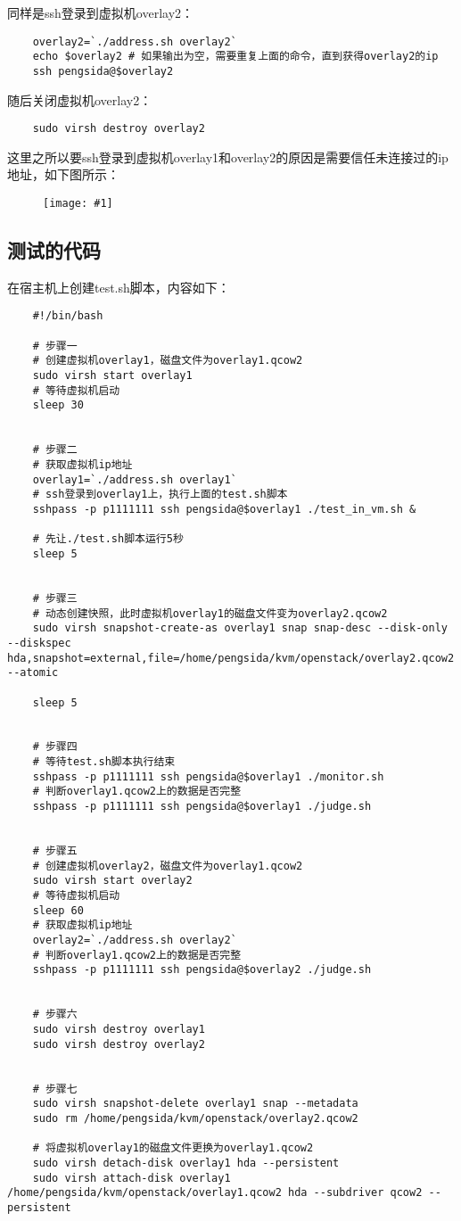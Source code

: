 \documentclass[a4paper,left=1.5cm,right=1.5cm,11pt]{article}
\newcommand{\fic}[1]{\begin{figure}[H]
		\center
		\texttt{[image: \#1]}
	\end{figure}}
\begin{document}
	同样是ssh登录到虚拟机overlay2：
	\begin{lstlisting}
	overlay2=`./address.sh overlay2`
	echo $overlay2 # 如果输出为空，需要重复上面的命令，直到获得overlay2的ip
	ssh pengsida@$overlay2
	\end{lstlisting}

	随后关闭虚拟机overlay2：
	\begin{lstlisting}
	sudo virsh destroy overlay2
	\end{lstlisting}

	这里之所以要ssh登录到虚拟机overlay1和overlay2的原因是需要信任未连接过的ip地址，如下图所示：
	\fic{1.png}

\subsection{测试的代码}
	在宿主机上创建test.sh脚本，内容如下：
	\begin{lstlisting}
	#!/bin/bash

	# 步骤一
	# 创建虚拟机overlay1，磁盘文件为overlay1.qcow2
	sudo virsh start overlay1
	# 等待虚拟机启动
	sleep 30


	# 步骤二
	# 获取虚拟机ip地址
	overlay1=`./address.sh overlay1`
	# ssh登录到overlay1上，执行上面的test.sh脚本
	sshpass -p p1111111 ssh pengsida@$overlay1 ./test_in_vm.sh &

	# 先让./test.sh脚本运行5秒
	sleep 5


	# 步骤三
	# 动态创建快照，此时虚拟机overlay1的磁盘文件变为overlay2.qcow2
	sudo virsh snapshot-create-as overlay1 snap snap-desc --disk-only --diskspec hda,snapshot=external,file=/home/pengsida/kvm/openstack/overlay2.qcow2 --atomic

	sleep 5


	# 步骤四
	# 等待test.sh脚本执行结束
	sshpass -p p1111111 ssh pengsida@$overlay1 ./monitor.sh
	# 判断overlay1.qcow2上的数据是否完整
	sshpass -p p1111111 ssh pengsida@$overlay1 ./judge.sh


	# 步骤五
	# 创建虚拟机overlay2，磁盘文件为overlay1.qcow2
	sudo virsh start overlay2
	# 等待虚拟机启动
	sleep 60
	# 获取虚拟机ip地址
	overlay2=`./address.sh overlay2`
	# 判断overlay1.qcow2上的数据是否完整
	sshpass -p p1111111 ssh pengsida@$overlay2 ./judge.sh


	# 步骤六
	sudo virsh destroy overlay1
	sudo virsh destroy overlay2


	# 步骤七
	sudo virsh snapshot-delete overlay1 snap --metadata
	sudo rm /home/pengsida/kvm/openstack/overlay2.qcow2

	# 将虚拟机overlay1的磁盘文件更换为overlay1.qcow2
	sudo virsh detach-disk overlay1 hda --persistent
	sudo virsh attach-disk overlay1 /home/pengsida/kvm/openstack/overlay1.qcow2 hda --subdriver qcow2 --persistent
	\end{lstlisting}
\end{document}
